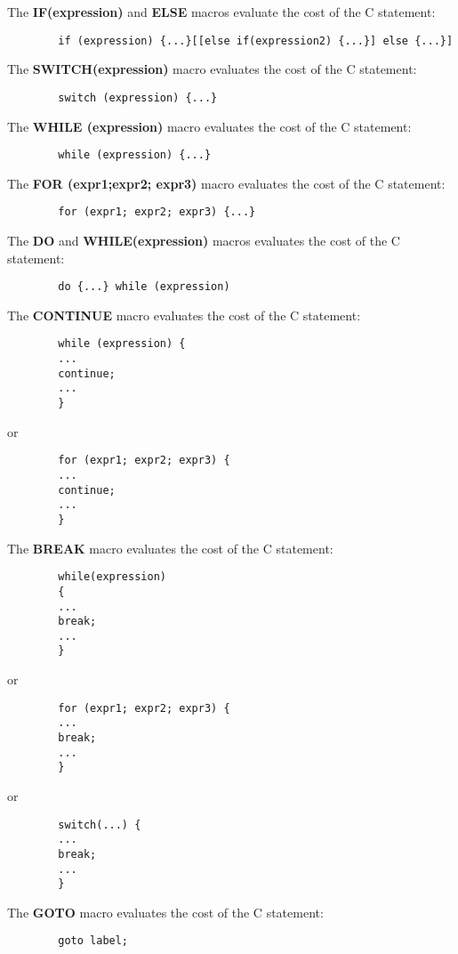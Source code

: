 \begin{list}{o}{}
    \item The \textbf{IF(expression)} and \textbf{ELSE} macros
    evaluate the cost of the C statement:
    {\small
    \begin{verbatim}
        if (expression) {...}[[else if(expression2) {...}] else {...}]
    \end{verbatim}}
    \item The \textbf{SWITCH(expression)} macro evaluates the cost of the C
    statement:
    {\small
    \begin{verbatim}
        switch (expression) {...}
    \end{verbatim}}
    \item The \textbf{WHILE (expression)} macro evaluates the cost of the C
    statement:
    {\small
    \begin{verbatim}
        while (expression) {...}
    \end{verbatim}}
    \item The \textbf{FOR (expr1;expr2; expr3)} macro evaluates the cost
    of the C statement:
    {\small
    \begin{verbatim}
        for (expr1; expr2; expr3) {...}
    \end{verbatim}}
    \item The \textbf{DO} and \textbf{WHILE(expression)} macros evaluates
    the cost of the C statement:
    {\small
    \begin{verbatim}
        do {...} while (expression)
    \end{verbatim}}
    \item The \textbf{CONTINUE} macro evaluates the cost of the C statement:\\
    {\small
    \begin{verbatim}
        while (expression) {
        ...
        continue;
        ...
        }
    \end{verbatim}}
    or
    {\small
    \begin{verbatim}
        for (expr1; expr2; expr3) {
        ...
        continue;
        ...
        }
    \end{verbatim}}
    \item The \textbf{BREAK} macro evaluates the cost of the C statement:
    {\small
    \begin{verbatim}
        while(expression)
        {
        ...
        break;
        ...
        }
    \end{verbatim}}
    or
    {\small
    \begin{verbatim}
        for (expr1; expr2; expr3) {
        ...
        break;
        ...
        }
    \end{verbatim}}
    or
    {\small
    \begin{verbatim}
        switch(...) {
        ...
        break;
        ...
        }
    \end{verbatim}}
    \item The \textbf{GOTO} macro evaluates the cost of the C statement:
    {\small
    \begin{verbatim}
        goto label;
    \end{verbatim}}
\end{list}

